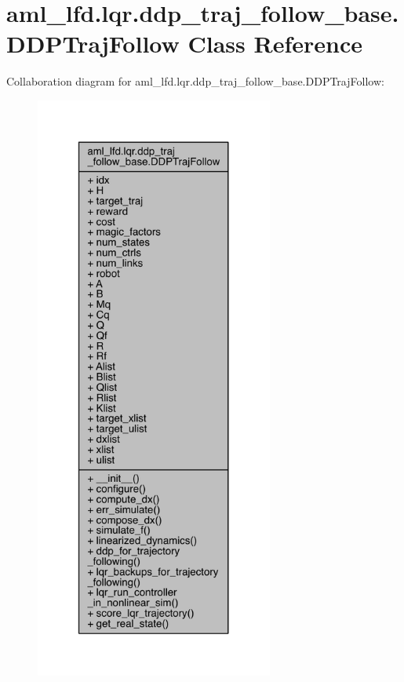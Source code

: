 \hypertarget{classaml__lfd_1_1lqr_1_1ddp__traj__follow__base_1_1_d_d_p_traj_follow}{}\section{aml\+\_\+lfd.\+lqr.\+ddp\+\_\+traj\+\_\+follow\+\_\+base.\+D\+D\+P\+Traj\+Follow Class Reference}
\label{classaml__lfd_1_1lqr_1_1ddp__traj__follow__base_1_1_d_d_p_traj_follow}


Collaboration diagram for aml\+\_\+lfd.\+lqr.\+ddp\+\_\+traj\+\_\+follow\+\_\+base.\+D\+D\+P\+Traj\+Follow\+:\nopagebreak
\begin{figure}[H]
\begin{center}
\leavevmode
\includegraphics[height=550pt]{classaml__lfd_1_1lqr_1_1ddp__traj__follow__base_1_1_d_d_p_traj_follow__coll__graph}
\end{center}
\end{figure}
